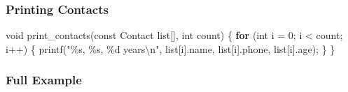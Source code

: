 \documentclass[
  letterpaper,
  DIV=11,
  numbers=noendperiod]{scrreprt}
\newenvironment{Shaded}{\begin{snugshade}}{\end{snugshade}}
\newcommand{\ControlFlowTok}[1]{\textcolor[rgb]{0.00,0.23,0.31}{\textbf{#1}}}
\newcommand{\DataTypeTok}[1]{\textcolor[rgb]{0.68,0.00,0.00}{#1}}
\newcommand{\DecValTok}[1]{\textcolor[rgb]{0.68,0.00,0.00}{#1}}
\newcommand{\NormalTok}[1]{\textcolor[rgb]{0.00,0.23,0.31}{#1}}
\newcommand{\OperatorTok}[1]{\textcolor[rgb]{0.37,0.37,0.37}{#1}}
\newcommand{\SpecialCharTok}[1]{\textcolor[rgb]{0.37,0.37,0.37}{#1}}
\newcommand{\StringTok}[1]{\textcolor[rgb]{0.13,0.47,0.30}{#1}}
\begin{document}
\subsubsection{Printing Contacts}\label{printing-contacts}

\begin{Shaded}
\begin{Highlighting}[]
\DataTypeTok{void}\NormalTok{ print\_contacts}\OperatorTok{(}\DataTypeTok{const}\NormalTok{ Contact list}\OperatorTok{[],} \DataTypeTok{int}\NormalTok{ count}\OperatorTok{)} \OperatorTok{\{}
    \ControlFlowTok{for} \OperatorTok{(}\DataTypeTok{int}\NormalTok{ i }\OperatorTok{=} \DecValTok{0}\OperatorTok{;}\NormalTok{ i }\OperatorTok{\textless{}}\NormalTok{ count}\OperatorTok{;}\NormalTok{ i}\OperatorTok{++)} \OperatorTok{\{}
\NormalTok{        printf}\OperatorTok{(}\StringTok{"}\SpecialCharTok{\%s}\StringTok{, }\SpecialCharTok{\%s}\StringTok{, }\SpecialCharTok{\%d}\StringTok{ years}\SpecialCharTok{\textbackslash{}n}\StringTok{"}\OperatorTok{,}\NormalTok{ list}\OperatorTok{[}\NormalTok{i}\OperatorTok{].}\NormalTok{name}\OperatorTok{,}\NormalTok{ list}\OperatorTok{[}\NormalTok{i}\OperatorTok{].}\NormalTok{phone}\OperatorTok{,}\NormalTok{ list}\OperatorTok{[}\NormalTok{i}\OperatorTok{].}\NormalTok{age}\OperatorTok{);}
    \OperatorTok{\}}
\OperatorTok{\}}
\end{Highlighting}
\end{Shaded}

\subsubsection{Full Example}\label{full-example}
\end{document}
